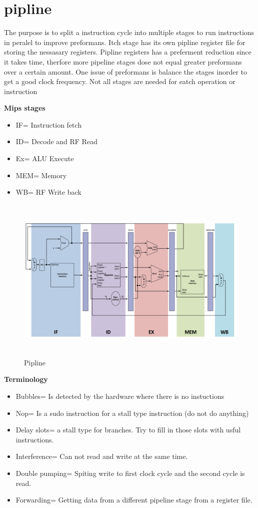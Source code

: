 \newpage


\section{pipline}
The purpose is to split a instruction cycle into multiple stages to run instructions in peralel to
improve preformans. Itch stage has its own pipline register file for storing the nessasary registers.
Pipline registers has a preferment reduction since it takes time, therfore more pipeline stages dose
not equal greater preformans over a certain amount. One issue of preformans is balance the stages
inorder to get a good clock frequency. 
Not all stages are needed for eatch operation or instruction

\textbf{Mips stages}
\begin{itemize}
\item  IF= Instruction fetch
\item  ID= Decode and RF Read
\item  Ex= ALU Execute
\item  MEM= Memory
\item  WB= RF Write back
\end{itemize}

\begin{figure}[h]
    \vspace{10mm}
    \centering
    \includegraphics[width=16cm, height=8cm]{image/pipline.png} 
    \caption{Pipline}
    \label{pipline}
\end{figure}

\newpage

\textbf{Terminology}
\begin{itemize}
\item  Bubbles= Is detected by the hardware where there is no instuctions
\item  Nop= Is a sudo instruction for a stall type instruction (do not do anything)
\item  Delay slots= a stall type for branches. Try to fill in those slots with usful instructions.
\item  Interference= Can not read and write at the same time.
\item  Double pumping= Spiting write to first clock cycle and the second cycle is read.
\item  Forwarding= Getting data from a different pipeline stage from a register file.
\end{itemize}


